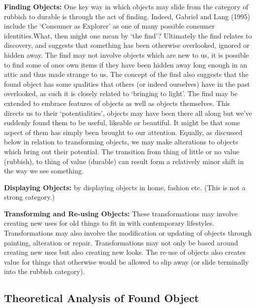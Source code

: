 \textbf{Finding Objects:} One key way in which objects may slide from the category of rubbish to durable is through the act of finding. Indeed, Gabriel and Lang (1995) include the ‘Consumer as Explorer’ as one of many possible consumer identities.What, then might one mean by ‘the find’? Ultimately the find relates to discovery, and suggests that something has been otherwise overlooked, ignored or hidden away. The find may not involve objects which are new to us, it is possible to find some of ones own items if they have been hidden away long enough in an attic and thus made strange to us. The concept of the find also suggests that the found object has some qualities that others (or indeed ourselves) have in the past overlooked, as such it is closely related to ‘bringing to light’. The find may be extended to embrace features of objects as well as objects themselves. This directs us to their ‘potentialities’, objects may have been there all along but we’ve suddenly found them to be useful, likeable or beautiful. It might be that some aspect of them has simply been brought to our attention. Equally, as discussed below in relation to transforming objects, we may make alterations to objects which bring out their potential. The transition from thing of little or no value (rubbish), to thing of value (durable) can result form a relatively minor shift in the way we see something.

\textbf{Displaying Objects:} by displaying objects in home, fashion etc. (This is not a strong category.)

\textbf{Transforming and Re-using Objects:} These transformations may involve creating new uses for old things to fit in with contemporary lifestyles. Transformations may also involve the modification or updating of objects through painting, alteration or repair. Transformations may not only be based around creating new uses but also creating new looks. The re-use of objects also creates value for things that otherwise would be allowed to slip away (or slide terminally into the rubbish category).

\subsection{Theoretical Analysis of Found Object}
